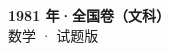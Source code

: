 \documentclass[zihao=-4, a4paper]{ctexart}
\begin{document}
\begin{center}
  {\Large\bfseries 1981 年·全国卷（文科）}\\[4pt]
  {\large 数学 · 试题版}
\end{center}
\medskip
{}

\end{document}
